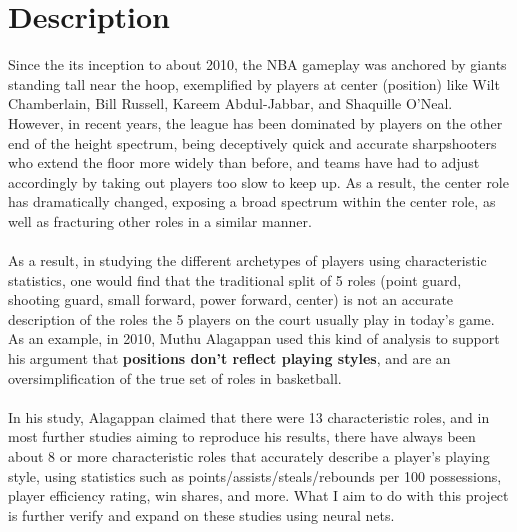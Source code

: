 \documentclass[12pt]{article}
\begin{document}
    \setlength{\parindent}{0in}
    \addtolength{\parskip}{0.1cm}
    \setlength{\fboxrule}{.5mm}\setlength{\fboxsep}{1.2mm}
    \newlength{\boxlength}\setlength{\boxlength}{\textwidth}
    \addtolength{\boxlength}{-4mm}
    \begin{center}
    \end{center}
    \vspace{5mm}
    \section{Description}
    Since the its inception to about 2010, the NBA gameplay was anchored by giants standing tall near the hoop, exemplified by players at center (position) like Wilt Chamberlain, Bill Russell, Kareem Abdul-Jabbar, and Shaquille O'Neal. However, in recent years, the league has been dominated by players on the other end of the height spectrum, being deceptively quick and accurate sharpshooters who extend the floor more widely than before, and teams have had to adjust accordingly by taking out players too slow to keep up. As a result, the center role has dramatically changed, exposing a broad spectrum within the center role, as well as fracturing other roles in a similar manner. \\ \\
    As a result, in studying the different archetypes of players using characteristic statistics,  one would find that the traditional split of 5 roles (point guard, shooting guard, small forward, power forward, center) is not an accurate description of the roles the 5 players on the court usually play in today's game. As an example, in 2010, Muthu Alagappan used this kind of analysis to support his argument that \textbf{positions don't reflect playing styles}, and are an oversimplification of the true set of roles in basketball. \\ \\
    In his study, Alagappan claimed that there were 13 characteristic roles, and in most further studies aiming to reproduce his results, there have always been about 8 or more characteristic roles that accurately describe a player's playing style, using statistics such as points/assists/steals/rebounds per 100 possessions, player efficiency rating, win shares, and more. What I aim to do with this project is further verify and expand on these studies using neural nets.
\end{document}
